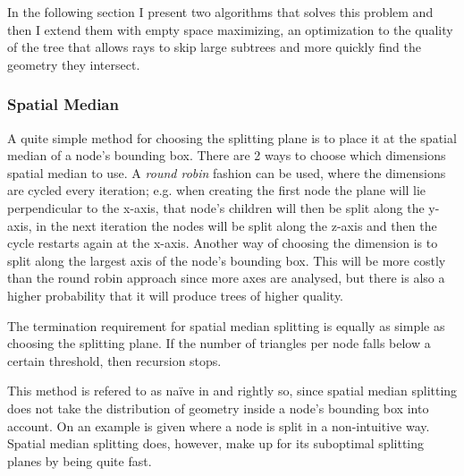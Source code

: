 In the following section I present two algorithms that solves this problem and
then I extend them with empty space maximizing, an optimization to the quality
of the tree that allows rays to skip large subtrees and more quickly find the
geometry they intersect.


\subsubsection{Spatial Median}



A quite simple method for choosing the splitting plane is to place it at the
spatial median of a node's bounding box. There are 2 ways to choose which
dimensions spatial median to use. A \textit{round robin} fashion can be used,
where the dimensions are cycled every iteration; e.g. when creating the first
node the plane will lie perpendicular to the x-axis, that node's children will
then be split along the y-axis, in the next iteration the nodes will be split
along the z-axis and then the cycle restarts again at the x-axis. Another way of
choosing the dimension is to split along the largest axis of the node's bounding
box. This will be more costly than the round robin approach since more axes are
analysed, but there is also a higher probability that it will produce trees of
higher quality.

The termination requirement for spatial median splitting is equally as simple as
choosing the splitting plane. If the number of triangles per node falls below a
certain threshold, then recursion stops.


This method is refered to as naïve in  and rightly so,
since spatial median splitting does not take the distribution of geometry inside
a node's bounding box into account. On  an example is
given where a node is split in a non-intuitive way. Spatial median splitting
does, however, make up for its suboptimal splitting planes by being quite fast.


